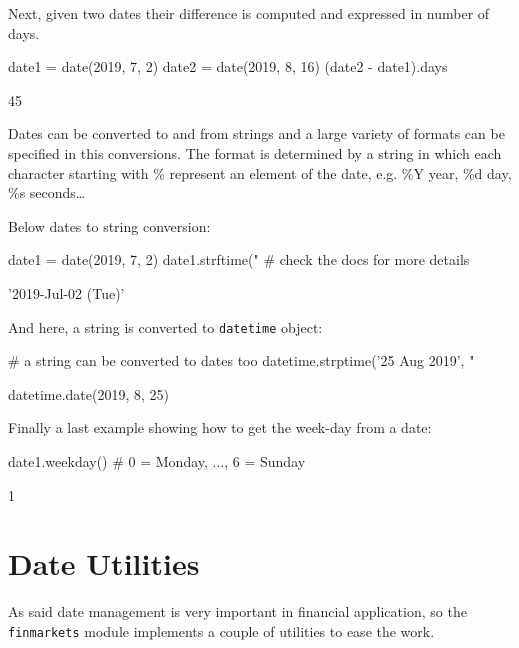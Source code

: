Next, given two dates their difference is computed and expressed in number of days.

\begin{ipythonnon}
date1 = date(2019, 7, 2)
date2 = date(2019, 8, 16)
(date2 - date1).days
\end{ipythonnon}
\begin{ioutput}
45
\end{ioutput}

Dates can be converted to and from strings and a large variety of formats can be specified in this conversions. 
The format is determined by a string in which each character starting with \% represent an element 
of the date, e.g. \%Y year, \%d day, \%s seconds\ldots

Below dates to string conversion:

\begin{ipythonnon}
date1 = date(2019, 7, 2)
date1.strftime("%
                                # check the docs for more details
\end{ipythonnon}
\begin{ioutput}
'2019-Jul-02 (Tue)'
\end{ioutput}

And here, a string is converted to \texttt{datetime} object:

\begin{ipythonnon}
# a string can be converted to dates too
datetime.strptime('25 Aug 2019', "%
\end{ipythonnon}
\begin{ioutput}
datetime.date(2019, 8, 25)
\end{ioutput}

Finally a last example showing how to get the week-day from a date:

\begin{ipythonnon}
date1.weekday() # 0 = Monday, ..., 6 = Sunday
\end{ipythonnon}
\begin{ioutput}
1
\end{ioutput}

\section{Date Utilities}

As said date management is very important in financial application, so the \texttt{finmarkets} module implements a couple of utilities to ease the work. 

